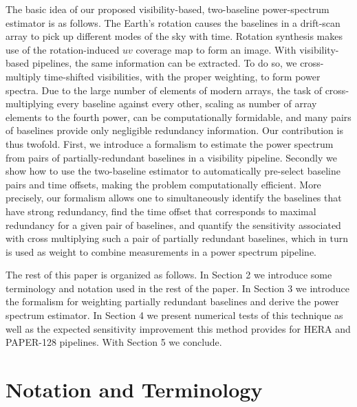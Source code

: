 \documentclass[twocolumn,apj,numberedappendix]{emulateapj}
\renewcommand\[{\begin{equation}}
\renewcommand\]{\end{equation}}
\begin{document}
The basic idea of our proposed visibility-based, two-baseline power-spectrum estimator is as follows. The Earth's rotation causes the baselines in a drift-scan array to pick up different modes of the sky with time. Rotation synthesis makes use of the rotation-induced $uv$ coverage map to form an image. With visibility-based pipelines, the same information can be extracted. To do so, we cross-multiply time-shifted visibilities, with the proper weighting, to form power spectra.  Due to the large number of elements of modern arrays, the task of cross-multiplying every baseline against every other, scaling as number of array elements to the fourth power, can be computationally formidable, and many pairs of baselines provide only negligible redundancy information. Our contribution is thus twofold. First, we introduce a formalism to estimate the power spectrum from pairs of partially-redundant baselines in a visibility pipeline. Secondly we show how to use the two-baseline estimator to automatically pre-select baseline pairs and time offsets, making the problem computationally efficient. More precisely, our formalism allows one to simultaneously identify the baselines that have strong
redundancy, find the time offset that corresponds to maximal redundancy for a given pair of baselines, and quantify the sensitivity associated with cross multiplying
such a pair of partially redundant baselines, which in turn is used as weight to combine measurements in a power spectrum pipeline. 




The rest of this paper is organized as follows. In Section 2 we introduce some terminology and notation used in the rest of the paper. In Section
3 we introduce the formalism for weighting partially redundant baselines and derive the power spectrum estimator.
In Section 4 we present numerical tests of
this technique as well as the expected sensitivity improvement
 this method provides for HERA and PAPER-128 pipelines. With Section 5 we conclude. 

\section{Notation and Terminology}
\end{document}

